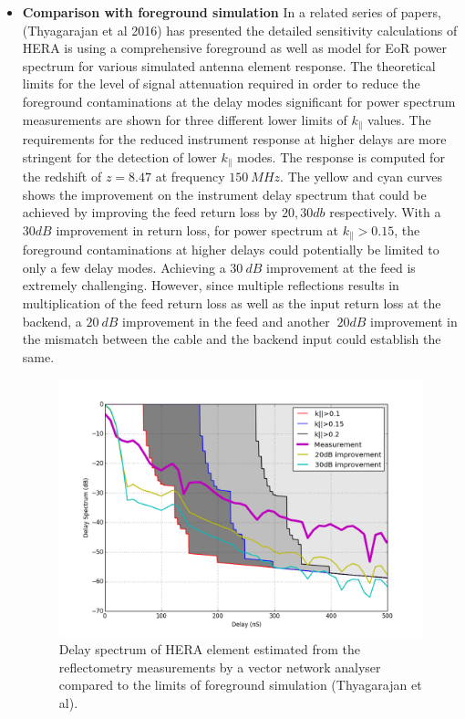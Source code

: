 \documentclass[twocolumn]{emulateapj}
\begin{document}
\begin{itemize}
\item
\textbf{Comparison with foreground simulation}
In a related series of papers, (Thyagarajan et al 2016) has presented the detailed sensitivity calculations of HERA is using a comprehensive foreground as well as model for EoR power spectrum for various simulated antenna element response. The theoretical limits for the level of signal attenuation required in order to reduce the foreground contaminations at the delay modes significant for power spectrum measurements are shown for three different lower limits of $k_\parallel$ values. The requirements for the reduced instrument response at higher delays are more stringent for the detection of lower $k_\parallel$ modes. The response is computed for the redshift of $z=8.47$ at frequency $150~MHz$. The yellow and cyan curves shows the improvement on the instrument delay spectrum that could be achieved by improving the feed return loss by $20, 30db$ respectively. With a $30dB$ improvement in return loss, for power spectrum at $k_{\parallel}>0.15$, the foreground contaminations at higher delays could potentially be limited to only a few delay modes. Achieving a $30~dB$ improvement at the feed is extremely challenging. However, since multiple reflections results in multiplication of the feed return loss as well as the input return loss at the backend, a $20~dB$ improvement in the feed and another $~20dB$ improvement in the mismatch between the cable and the backend input could establish the same. 

\begin{figure}
\centering
\includegraphics[width=\linewidth]{plots/meas_forground.png}
\caption{Delay spectrum of HERA element estimated from the reflectometry measurements by a vector network analyser compared to the limits of foreground simulation (Thyagarajan et al).}
\label{fig:sim_fg}
\end{figure}

\end{itemize}
\end{document}
